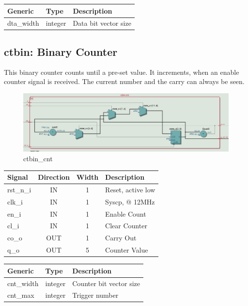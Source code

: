 \documentclass[12pt,a4 paper] {report}
\begin{document}
\begin{center}
	\begin{tabular}{| p{2cm} | p{2cm} | p{4cm} |}
	\hline
	\textbf{Generic} & \textbf{Type} & \textbf{Description} \\
	\hline
	dta\_width & integer & Data bit vector size \\
	\hline
	\end{tabular}
\end{center}

\newpage

\subsection{ctbin: Binary Counter}
This binary counter counts until a pre-set value. It increments, when an enable counter signal is received. The current 
number and the carry can always be seen.
\begin{figure}[h]
	\centering	
	\includegraphics[scale=0.3]{../png/ctbin_cnt.png}
	\caption{ctbin\_cnt}
\end{figure}
\begin{center}
	\begin{tabular}{ | p{2cm} | c | c | p{5cm} |}
		\hline
		\textbf{Signal} & \textbf{Direction} & \textbf{Width} & \textbf{Description} \\
		\hline	
 		 rst\_n\_i & IN & 1 & Reset, active low \\
 		 \hline
		clk\_i & IN & 1 & Syscp, @ 12MHz \\
		\hline
		en\_i & IN & 1 & Enable Count \\
		\hline
		cl\_i & IN & 1 & Clear Counter \\
		\hline
		co\_o & OUT & 1 & Carry Out \\
		\hline
		q\_o & OUT & 5 & Counter Value \\
		\hline
	\end{tabular}
\end{center}
\begin{center}
	\begin{tabular}{| p{2cm} | p{2cm} | p{4cm} |}
		\hline
		\textbf{Generic} & \textbf{Type} & \textbf{Description} \\
		\hline
 		cnt\_width & integer & Counter bit vector size \\
		\hline
		cnt\_max & integer & Trigger number \\
		\hline
	\end{tabular}	
\end{center}
\end{document}
